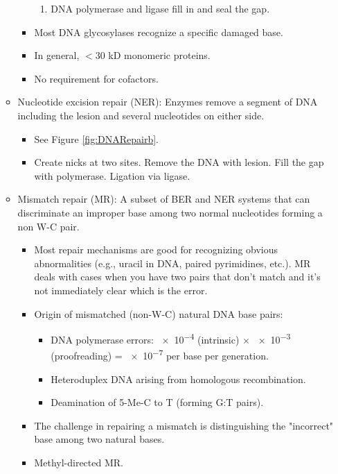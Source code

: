 \documentclass[../notes.tex]{subfiles}
\begin{document}
\begin{itemize}
\begin{itemize}
\begin{itemize}
\begin{enumerate}
                \item DNA polymerase and ligase fill in and seal the gap.
            \end{enumerate}
            \item Most DNA glycosylases recognize a specific damaged base.
            \item In general, $<30$ kD monomeric proteins.
            \item No requirement for cofactors.
        \end{itemize}
        \item Nucleotide excision repair (NER): Enzymes remove a segment of DNA including the lesion and several nucleotides on either side.
        \begin{itemize}
            \item See Figure \ref{fig:DNARepairb}.
            \item Create nicks at two sites. Remove the DNA with lesion. Fill the gap with polymerase. Ligation via ligase.
        \end{itemize}
        \item Mismatch repair (MR): A subset of BER and NER systems that can discriminate an improper base among two normal nucleotides forming a non W-C pair.
        \begin{itemize}
            \item Most repair mechanisms are good for recognizing obvious abnormalities (e.g., uracil in DNA, paired pyrimidines, etc.). MR deals with cases when you have two pairs that don't match and it's not immediately clear which is the error.
            \item Origin of mismatched (non-W-C) natural DNA base pairs:
            \begin{itemize}
                \item DNA polymerase errors: \num{e-4} (intrinsic) $\times$ \num{e-3} (proofreading) = \num{e-7} per base per generation.
                \item Heteroduplex DNA arising from homologous recombination.
                \item Deamination of 5-Me-C to T (forming G:T pairs).
            \end{itemize}
            \item The challenge in repairing a mismatch is distinguishing the "incorrect" base among two natural bases.
            \item Methyl-directed MR.
            \begin{itemize}

\end{itemize}
\end{itemize}
\end{itemize}
\end{itemize}
\end{document}
